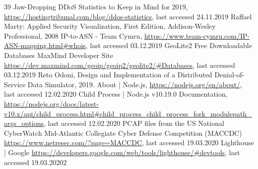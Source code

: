 \begin{thebibliography}{99}
 39 Jaw-Dropping DDoS Statistics to Keep in Mind for 2019, \url{https://hostingtribunal.com/blog/ddos-statistics}, last accessed 24.11.2019
 Raffael Marty: Applied Security Visualization, First Edition, Addison-Wesley Professional, 2008
 IP-to-ASN - Team Cymru, \url{https://www.team-cymru.com/IP-ASN-mapping.html#whois}, last accessed 03.12.2019
 GeoLite2 Free Downloadable Databases MaxMind Developer Site \url{https://dev.maxmind.com/geoip/geoip2/geolite2/#Databases}, last accessed 03.12.2019
 Reto Odoni, Design and Implementation of a Distributed Denial-of-Service Data Simulator, 2019.
 About | Node.js, \url{https://nodejs.org/en/about/}, last accessed 12.02.2020
 Child Process | Node.js v10.19.0 Documentation, \url{https://nodejs.org/docs/latest-v10.x/api/child_process.html#child_process_child_process_fork_modulepath_args_options}, last accessed 12.02.2020
 PCAP files from the US National CyberWatch Mid-Atlantic Collegiate Cyber Defense Competition (MACCDC) \url{https://www.netresec.com/?page=MACCDC}, last accessed 19.03.2020
 Lighthouse | Google \url{https://developers.google.com/web/tools/lighthouse/#devtools}, last accessed 19.03.20202
\end{thebibliography}

